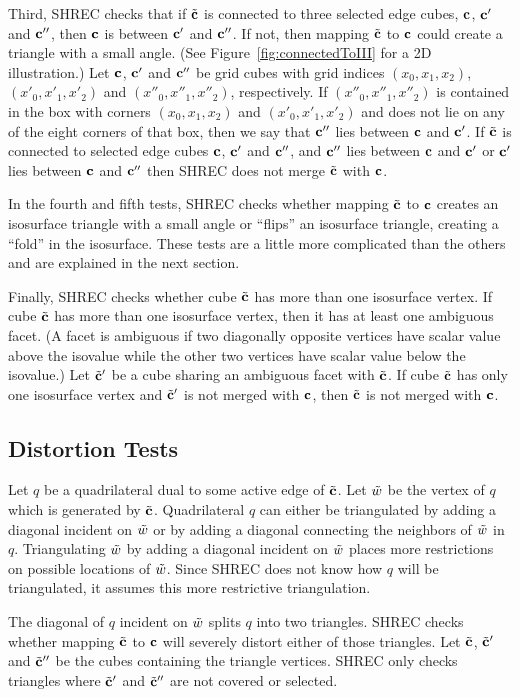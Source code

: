 Third, SHREC checks that if ${\tilde{\mathbf{c}}}$ is connected to three selected edge cubes,
$\mathbf{c}$, $\mathbf{c}'$ and $\mathbf{c}''$, then $\mathbf{c}$ is between $\mathbf{c}'$ and $\mathbf{c}''$.
If not, then mapping ${\tilde{\mathbf{c}}}$ to $\mathbf{c}$ could create a triangle 
with a small angle.
(See Figure~\ref{fig:connectedToIII} for a 2D illustration.)
Let $\mathbf{c}$, $\mathbf{c}'$ and $\mathbf{c}''$ be grid cubes with grid indices
$(x_0,x_1,x_2)$, $(x'_0,x'_1,x'_2)$ and $(x''_0,x''_1,x''_2)$, respectively.
If $(x''_0,x''_1,x''_2)$ is contained in the box with corners
$(x_0,x_1,x_2)$ and $(x'_0,x'_1,x'_2)$ and does not lie on any 
of the eight corners of that box,
then we say that $\mathbf{c}''$ lies between $\mathbf{c}$ and $\mathbf{c}'$.
If ${\tilde{\mathbf{c}}}$ is connected to selected edge cubes $\mathbf{c}$, $\mathbf{c}'$ and $\mathbf{c}''$,
and $\mathbf{c}''$ lies between $\mathbf{c}$ and $\mathbf{c}'$
or $\mathbf{c}'$ lies between $\mathbf{c}$ and $\mathbf{c}''$
then SHREC does not merge ${\tilde{\mathbf{c}}}$ with $\mathbf{c}$.

In the fourth and fifth tests,
SHREC checks whether mapping ${\tilde{\mathbf{c}}}$ to $\mathbf{c}$ creates an isosurface triangle 
with a small angle or ``flips'' an isosurface triangle,
creating a ``fold'' in the isosurface.
These tests are a little more complicated than the others
and are explained in the next section.

Finally, SHREC checks whether cube ${\tilde{\mathbf{c}}}$ has more than one isosurface vertex.
If cube ${\tilde{\mathbf{c}}}$ has more than one isosurface vertex,
then it has at least one ambiguous facet.
(A facet is ambiguous if two diagonally opposite vertices have
scalar value above the isovalue while the other two vertices
have scalar value below the isovalue.)
Let ${\tilde{\mathbf{c}}}'$ be a cube sharing an ambiguous facet with ${\tilde{\mathbf{c}}}$.
If cube ${\tilde{\mathbf{c}}}$ has only one isosurface vertex and 
${\tilde{\mathbf{c}}}'$ is not merged with $\mathbf{c}$, then ${\tilde{\mathbf{c}}}$ is not merged with $\mathbf{c}$.

\subsection{Distortion Tests}
\label{section:distortion_tests}

Let $q$ be a quadrilateral dual to some active edge of ${\tilde{\mathbf{c}}}$.
Let $\tilde{w}$ be the vertex of $q$ which is generated by ${\tilde{\mathbf{c}}}$.
Quadrilateral $q$ can either be triangulated by adding a diagonal
incident on $\tilde{w}$ or by adding a diagonal connecting the neighbors
of $\tilde{w}$ in $q$.
Triangulating $\tilde{w}$ by adding a diagonal incident on $\tilde{w}$
places more restrictions on possible locations of $\tilde{w}$.
Since SHREC does not know how $q$ will be triangulated,
it assumes this more restrictive triangulation.

The diagonal of $q$ incident on $\tilde{w}$ splits $q$ into two triangles.
SHREC checks whether mapping ${\tilde{\mathbf{c}}}$ to $\mathbf{c}$ will severely distort
either of those triangles.
Let ${\tilde{\mathbf{c}}}$, ${\tilde{\mathbf{c}}}'$ and ${\tilde{\mathbf{c}}}''$ be the cubes 
containing the triangle vertices.
SHREC only checks triangles where ${\tilde{\mathbf{c}}}'$ and ${\tilde{\mathbf{c}}}''$ 
are not covered or selected.

